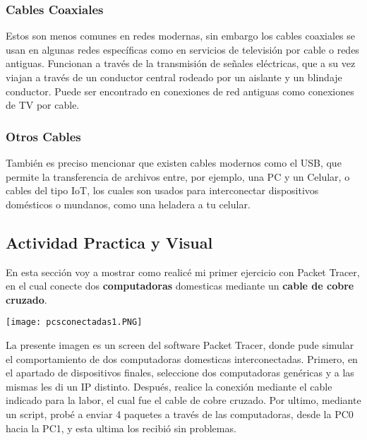 \documentclass{article}
\begin{document}
\subsubsection{Cables Coaxiales}
Estos son menos comunes en redes modernas, sin embargo los cables coaxiales se usan en algunas redes específicas como en servicios de televisión por cable o redes antiguas. Funcionan a través de la transmisión de señales eléctricas, que a su vez viajan a través de un conductor central rodeado por un aislante y un blindaje conductor. Puede ser encontrado en conexiones de red antiguas como conexiones de TV por cable.

\subsubsection{Otros Cables}
También es preciso mencionar que existen cables modernos como el USB, que permite la transferencia de archivos entre, por ejemplo, una PC y un Celular, o cables del tipo IoT, los cuales son usados para interconectar dispositivos domésticos o mundanos, como una heladera a tu celular. 

\newpage


\subsection{Actividad Practica y Visual }
En esta sección voy a mostrar como realicé mi primer ejercicio con Packet Tracer, en el cual conecte dos \textbf{computadoras} domesticas mediante un \textbf{cable de cobre cruzado}.

\texttt{[image: pcsconectadas1.PNG]}

La presente imagen es un screen del software Packet Tracer, donde pude simular el comportamiento de dos computadoras domesticas interconectadas. Primero, en el apartado de dispositivos finales, seleccione dos computadoras genéricas y a las mismas les di un IP distinto. Después, realice la conexión mediante el cable indicado para la labor, el cual fue el cable de cobre cruzado. Por ultimo, mediante un script, probé a enviar 4 paquetes a través de las computadoras, desde la PC0 hacia la PC1, y esta ultima los recibió sin problemas.

\end{document}

